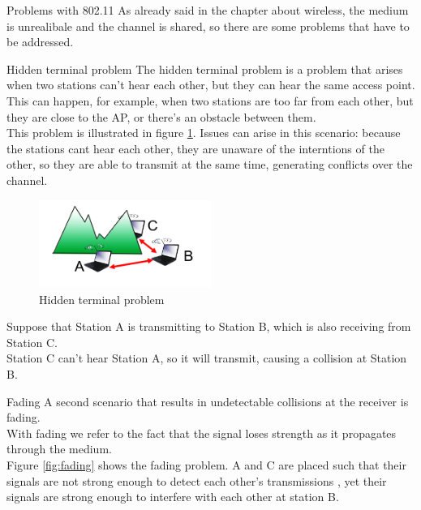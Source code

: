 \begin{section}{Problems with 802.11}
  As already said in the chapter about wireless, the medium is unrealibale and the channel is shared, so
  there are some problems that have to be addressed.
  \begin{subsection}{Hidden terminal problem}
    The hidden terminal problem is a problem that arises when two stations can't hear each other, but they
    can hear the same access point.\\
    This can happen, for example, when two stations are too far from each other, but they are close 
    to the AP, or there's an obstacle between them.\\
    This problem is illustrated in figure \ref{fig:hidden terminal problem}.
    Issues can arise in this scenario: because the stations cant hear each other, they are unaware
    of the interntions of the other, so they are able to transmit at the same time, generating
    conflicts over the channel.
    \begin{figure}[h]
      \centering
      \includegraphics[width=0.5\textwidth]{img/wireless/hidden terminal problem.png}
      \caption{Hidden terminal problem}
      \label{fig:hidden terminal problem}
    \end{figure}
    Suppose that Station A is transmitting to Station B, which is also receiving from Station C.\\
    Station C can't hear Station A, so it will transmit, causing a collision at Station B.
  \end{subsection}
  \begin{subsection}{Fading}
    A second scenario that results in undetectable collisions at the receiver is fading.\\
    With fading we refer to the fact that the signal loses strength as it propagates through the medium.\\
    Figure \ref{fig:fading} shows the fading problem. A and C are placed such that their signals 
    are not strong enough to detect each other's transmissions , yet their signals are strong 
    enough to interfere with each other at station B.
    \begin{figure}[h]

\end{figure}
\end{subsection}
\end{section}
